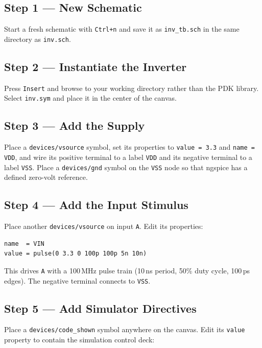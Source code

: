 \documentclass[11pt]{article}
\begin{document}
\subsection{Step 1 --- New Schematic}

Start a fresh schematic with \texttt{Ctrl+n} and save it as
\texttt{inv\_tb.sch} in the same directory as \texttt{inv.sch}.

\subsection{Step 2 --- Instantiate the Inverter}

Press \texttt{Insert} and browse to your working directory rather than
the PDK library.
Select \texttt{inv.sym} and place it in the center of the canvas.

\subsection{Step 3 --- Add the Supply}

Place a \texttt{devices/vsource} symbol, set its properties to
\texttt{value = 3.3} and \texttt{name = VDD}, and wire its positive
terminal to a label \texttt{VDD} and its negative terminal to a label
\texttt{VSS}.
Place a \texttt{devices/gnd} symbol on the \texttt{VSS} node so that
ngspice has a defined zero-volt reference.

\subsection{Step 4 --- Add the Input Stimulus}

Place another \texttt{devices/vsource} on input \texttt{A}.
Edit its properties:

\begin{lstlisting}
name  = VIN
value = pulse(0 3.3 0 100p 100p 5n 10n)
\end{lstlisting}

This drives \texttt{A} with a 100\,MHz pulse train (10\,ns period,
50\% duty cycle, 100\,ps edges).
The negative terminal connects to \texttt{VSS}.

\subsection{Step 5 --- Add Simulator Directives}

Place a \texttt{devices/code\_shown} symbol anywhere on the canvas.
Edit its \texttt{value} property to contain the simulation control
deck:
\end{document}
